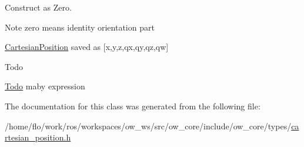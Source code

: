 Construct as Zero. 

\begin{DoxyNote}{Note}
zero means identity orientation part 

\hyperlink{classow__core_1_1CartesianPosition}{Cartesian\+Position} saved as \mbox{[}x,y,z,qx,qy,qz,qw\mbox{]} 
\end{DoxyNote}
\begin{DoxyRefDesc}{Todo}
\item[\hyperlink{todo__todo000003}{Todo}]maby expression \end{DoxyRefDesc}


The documentation for this class was generated from the following file\+:\begin{DoxyCompactItemize}
\item 
/home/flo/work/ros/workspaces/ow\+\_\+ws/src/ow\+\_\+core/include/ow\+\_\+core/types/\hyperlink{cartesian__position_8h}{cartesian\+\_\+position.\+h}\end{DoxyCompactItemize}
